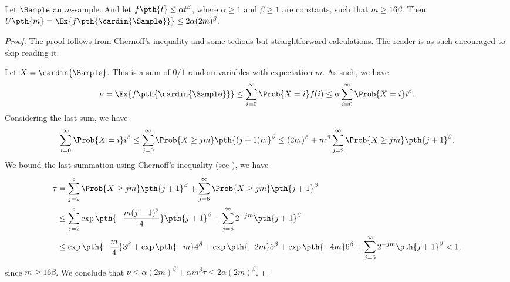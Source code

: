 \newcommand{\cEFunc}[1]{U\pth{#1}}
\newcommand{\cFuncX}[1]{f\pth{#1}}%
\begin{lemma}
    Let $\Sample$ an $m$-sample. And let
    $\cFuncX{t} \leq \alpha t^\beta$, where $\alpha\geq 1$ and
    $\beta\geq 1$ are constants, such that $m \geq 16\beta$. Then
    \begin{math}
        \cEFunc{m} = \Ex{\bigl.  \cFuncX{\bigl. \cardin{\Sample}} } \leq 2
        \alpha (2m)^\beta.
    \end{math}
\end{lemma}
\begin{proof}
    The proof follows from Chernoff's inequality and some tedious but
    straightforward calculations. The reader is as such encouraged to
    skip reading it.

    Let $X = \cardin{\Sample}$. This is a sum of $0/1$ random variables with
    expectation $m$. As such, we have
    \begin{equation*}
        \nu%
        =%
        \Ex{\bigl. \cFuncX{\bigl.\cardin{\Sample}} }%
        \leq %
        \sum_{i=0}^\infty \Prob{X = i} f(i)
        \leq%
        \alpha 
        \sum_{i=0}^\infty \Prob{X = i} 
        i^\beta.        
    \end{equation*}
    Considering the last sum, we have
    \begin{equation*}
        \sum_{i=0}^\infty \Prob{\big. X = i} i^\beta
        \leq %
        \sum_{j=0}^\infty \Prob{\big. X \geq  j  m } \pth{(j+1) m}^\beta%
        \leq %
        (2m)^\beta  
        + m^\beta \sum_{j=2}^\infty \Prob{\big. X \geq  j  m }
        \pth{j+1 }^\beta.%
    \end{equation*}
    We bound the last summation using Chernoff's inequality (see
    ), we have
    \begin{align*}
      \tau%
      &= %
        \sum_{j=2}^5 \Prob{\big. X \geq  j  m }
        \pth{j+1 }^\beta
        + 
        \sum_{j=6}^\infty \Prob{\big. X \geq  j  m }
        \pth{j+1 }^\beta
      \\&%
      \leq      
      \sum_{j=2}^5 \exp \pth{ - \frac{m (j-1)^2}{4} }
      \pth{j+1 }^\beta
      + 
      \sum_{j=6}^\infty 2^{-jm}
      \pth{j+1 }^\beta %
      \\&%
      \leq%
      \exp\pth{ - \frac{m}{4} } 3^\beta
      + \exp\pth{ - m} 4^\beta 
      + \exp\pth{ - 2m} 5^\beta 
      + \exp\pth{ - 4m} 6^\beta 
      + \sum_{j=6}^\infty 2^{-jm}
      \pth{j+1 }^\beta %
      < 1,
    \end{align*}
    since $m \geq 16 \beta$. We conclude that
    $\nu \leq \alpha (2 m)^\beta + \alpha m^\beta \tau \leq 2
    \alpha(2m)^\beta$.
\end{proof}

